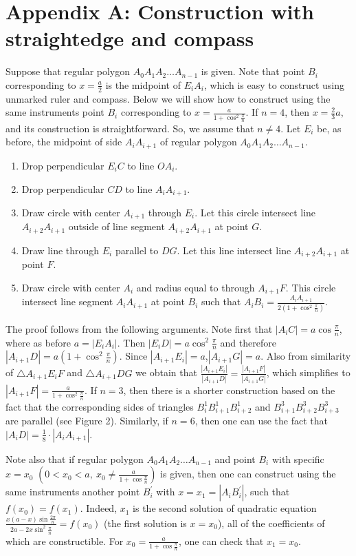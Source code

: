 \documentclass{birkjour}
\theoremstyle{definition}
\theoremstyle{remark}
\numberwithin{equation}{section}
\begin{document}
\section*{Appendix A: Construction with straightedge and compass} Suppose that regular polygon $A_0 A_1 A_2\ldots A_{n-1}$ is given. Note that point $B_i$ corresponding to $x=\frac{a}{2}$ is the midpoint of $E_i A_{i}$, which is easy to construct using unmarked ruler and compass.
Below we will show how to construct using the same instruments point $B_i$ corresponding to $x=\frac{a}{1+\cos^2{\frac{\pi}{n}}}$. If $n=4$, then $x=\frac{2}{3}a$, and its construction is straightforward. So, we assume that $n\ne 4$.
Let $E_i$ be, as before, the midpoint of side $A_i A_{i+1}$ of regular polygon $A_0 A_1 A_2\ldots A_{n-1}$.
\begin{enumerate}
\item Drop perpendicular $E_iC$ to line $OA_i$.
\item Drop perpendicular $CD$ to line $A_iA_{i+1}$.
\item Draw circle with center $A_{i+1}$ through $E_i$. Let this circle intersect line $A_{i+2}A_{i+1}$ outside of line segment $A_{i+2}A_{i+1}$ at point $G$.
\item Draw line through $E_i$ parallel to $DG$. Let this line intersect line $A_{i+2}A_{i+1}$ at point $F$.
\item Draw circle with center $A_{i}$ and radius equal to through $A_{i+1}F$. This circle intersect line segment $A_{i}A_{i+1}$ at point $B_i$ such that $A_iB_i=\frac{A_iA_{i+1}}{2\left(1+\cos^2{\frac{\pi}{n}}\right)}$.
\end{enumerate}
The proof follows from the following arguments. Note first that $|A_iC|=a\cos{\frac{\pi}{n}}$, where as before $a=|E_iA_{i}|$. Then $|E_iD|=a\cos^2{\frac{\pi}{n}}$ and therefore $|A_{i+1}D|=a\left(1+\cos^2{\frac{\pi}{n}}\right)$. Since $|A_{i+1}E_i|=a$,$|A_{i+1}G|=a$.  Also from similarity of $\triangle A_{i+1}E_iF$ and $\triangle A_{i+1}DG$ we obtain that $\frac{|A_{i+1}E_i|}{|A_{i+1}D|}=\frac{|A_{i+1}F|}{|A_{i+1}G|}$, which simplifies to $|A_{i+1}F|=\frac{a}{1+\cos^2{\frac{\pi}{n}}}$. If $n=3$, then there is a shorter construction based on the fact that the corresponding sides of triangles $B_i^1B_{i+1}^1B_{i+2}^1$ and $B_{i+1}^3B_{i+2}^3B_{i+3}^3$ are parallel (see Figure 2). Similarly, if $n=6$, then one can use the fact that $|A_iD|=\frac{1}{8}\cdot |A_iA_{i+1}|$.

Note also that if regular polygon $A_0 A_1 A_2\ldots A_{n-1}$ and point $B_i$ with specific $x=x_0$ $(0<x_0<a,\ x_0\ne \frac{a}{1+\cos{\frac{\pi}{n}}})$ is given, then one can construct using the same instruments another point $B^{\prime}_i$ with $x=x_1=|A_iB^{\prime}_i|$, such that $
f(x_0)=f(x_1).
$ Indeed, $x_1$ is the second solution of quadratic equation $
\frac{x(a-x)\sin{\frac{2\pi}{n}}}{2a-2x\sin^2{\frac{\pi}{n}}}=f(x_0)
$ (the first solution is $x=x_0$), all of the coefficients of which are constructible. For $x_0= \frac{a}{1+\cos{\frac{\pi}{n}}}$, one can check that $x_1=x_0$.
\end{document}
